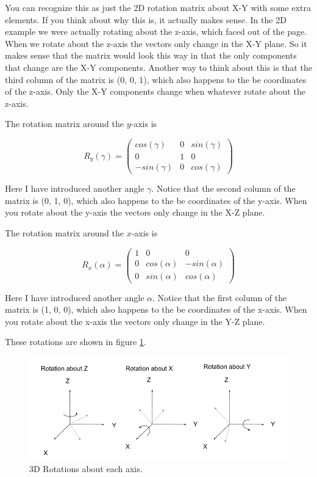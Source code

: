 \documentclass[11pt]{article}
\begin{document}
You can recognize this as just the 2D rotation matrix about X-Y with some extra elements.
If you think about why this is, it actually makes sense.  In the 2D example we were
actually rotating about the z-axis, which faced out of the page.  When we rotate about
the z-axis the vectors only change in the X-Y plane.  So it makes sense that the matrix
would look this way in that the only components that change are the X-Y components.  Another
way to think about this is that the third column of the matrix is (0, 0, 1), which also
happens to the be coordinates of the z-axis.  Only the X-Y components change when whatever
rotate about the z-axis.

The rotation matrix around the \(y\)-axis is

\begin{equation}
    R_y(\gamma) = 
    \begin{pmatrix}
        cos(\gamma) & 0 & sin(\gamma) \\
        0 & 1 & 0 \\
        -sin(\gamma) & 0 & cos(\gamma)
    \end{pmatrix}
\end{equation}

Here I have introduced another angle $\gamma$.  Notice that the second column of the matrix 
is (0, 1, 0), which also happens to the be coordinates of the y-axis.  When you rotate about
the y-axis the vectors only change in the X-Z plane.

The rotation matrix around the \(x\)-axis is

\begin{equation}
    R_x(\alpha) = 
    \begin{pmatrix}
        1 & 0 & 0 \\
        0 & cos(\alpha) & -sin(\alpha) \\
        0 & sin(\alpha) & cos(\alpha)
    \end{pmatrix}
\end{equation}

Here I have introduced another angle $\alpha$.  Notice that the first column of the matrix 
is (1, 0, 0), which also happens to the be coordinates of the x-axis.  When you rotate 
about the x-axis the vectors only change in the Y-Z plane.

These rotations are shown in figure \ref{fig:3d1}.

\begin{figure}[h!]
    \centering
    \includegraphics[scale=0.75]{figures/3d1.png}
    \caption{3D Rotations about each axis.}
    \label{fig:3d1}
\end{figure}
\end{document}
